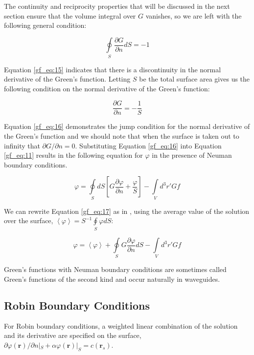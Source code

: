 The continuity and reciprocity properties that will be discussed in the next section ensure that the volume integral over $G$ vanishes, so we are left with the following general condition:

\begin{equation}
\oint\limits_{S}\frac{\partial G}{\partial n} dS = -1
\label{gf_eq:15}
\end{equation}
\renewcommand{\baselinestretch}{2} \small\normalsize

Equation \ref{gf_eq:15} indicates that there is a discontinuity in the normal derivative of the Green's function. Letting $S$ be the total surface area gives us the following condition on the normal derivative of the Green's function:

\begin{equation}
\frac{\partial G}{\partial n} = -\frac{1}{S}
\label{gf_eq:16}
\end{equation}
\renewcommand{\baselinestretch}{2} \small\normalsize

Equation \ref{gf_eq:16} demonstrates the jump condition for the normal derivative of the Green's function and we should note that when the surface is taken out to infinity that $\partial G/\partial n = 0$. Substituting Equation \ref{gf_eq:16} into Equation \ref{gf_eq:11} results in the following equation for $\varphi$ in the presence of Neuman boundary conditions.

\begin{equation}
\boxed{\varphi = \oint\limits_{S}dS\left[G\frac{\partial \varphi}{\partial n} + \frac{\varphi}{S} \right] -\int\limits_{V}d^3r' Gf}
\label{gf_eq:17}
\end{equation}
\renewcommand{\baselinestretch}{2} \small\normalsize

We can rewrite Equation \ref{gf_eq:17} as in \cite{jackson_classical_em}, using the average value of the solution over the surface, $\left< \varphi\right> = S^{-1}\oint\limits_{S}\varphi dS$:

\begin{equation}
\boxed{\varphi = \left<\varphi \right> + \oint\limits_{S}G\frac{\partial \varphi}{\partial n}dS  -\int\limits_{V}d^3r' Gf}
\label{gf_eq:18}
\end{equation}
\renewcommand{\baselinestretch}{2} \small\normalsize

Green's functions with Neuman boundary conditions are sometimes called Green's functions of the second kind and occur naturally in waveguides. 

\subsection {Robin Boundary Conditions}
For Robin boundary conditions, a weighted linear combination of the solution and its derivative are specified on the surface, $\partial\varphi\left(\mathbf{r}\right)/\partial n|_{S} +\alpha\varphi\left(\mathbf{r}\right) |_{S}= c\left(\mathbf{r}_s\right)$. 

